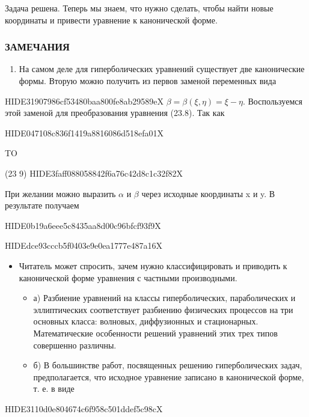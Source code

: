 \documentclass[
  ukrainian,
]{article}
\providecommand{\tightlist}{%
  \setlength{\itemsep}{0pt}\setlength{\parskip}{0pt}}
\begin{document}
Задача решена. Теперь мы знаем, что нужно сделать, чтобы найти новые
координаты и привести уравнение к канонической форме.

\subsubsection{ЗАМЕЧАНИЯ}\label{ux437ux430ux43cux435ux447ux430ux43dux438ux44f}

\begin{enumerate}
\def\labelenumi{\arabic{enumi}.}
\tightlist
\item
  На самом деле для гиперболических уравнений существует две
  канонические формы. Вторую можно получить из первов заменой переменных
  вида
\end{enumerate}

HIDE31907986cf53480baa800fe8ab29589eX
\(\beta = \beta (\xi, \eta) = \xi - \eta.\) Воспользуемся этой заменой
для преобразования уравнения (23.8). Так как

HIDE047108c836f1419a8816086d518efa01X

TO

(23 9) HIDE3faff088058842f6a76c42d8c1c32f82X

При желании можно выразить \(\alpha\) и \(\beta\) через исходные
координаты x и y. В результате получаем

HIDE0b19a6eee5c8435aa8d00c96bfcf93f9X

HIDEdce93cccb5f0403e9e0ea1777e487a16X

\begin{itemize}
\tightlist
\item
  Читатель может спросить, зачем нужно классифицировать и приводить к
  канонической форме уравнения с частными производными.

  \begin{itemize}
  \tightlist
  \item
    а) Разбиение уравнений на классы гиперболических, параболических и
    эллиптических соответствует разбиению физических процессов на три
    основных класса: волновых, диффузионных и стационарных.
    Математические особенности решений уравнений этих трех типов
    совершенно различны.
  \item
    б) В большинстве работ, посвященных решению гиперболических задач,
    предполагается, что исходное уравнение записано в канонической
    форме, т. е. в виде
  \end{itemize}
\end{itemize}

HIDE3110d0e804674c6f958c501ddef5c98cX
\end{document}
